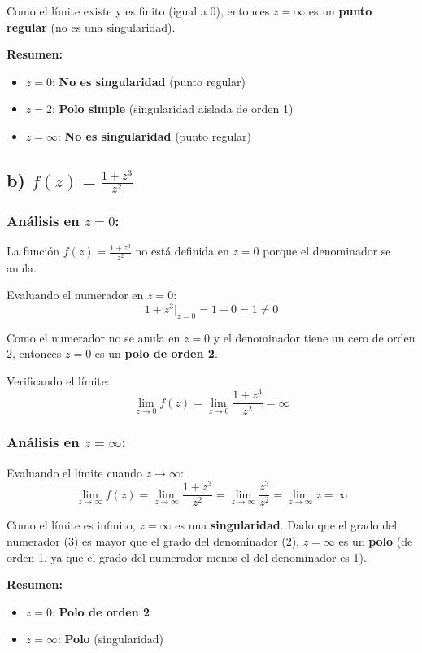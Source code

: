 \documentclass{article}
\begin{document}
Como el límite existe y es finito (igual a 0), entonces $z = \infty$ es un \textbf{punto regular} (no es una singularidad).

\textbf{Resumen:}
\begin{itemize}
\item $z = 0$: \textbf{No es singularidad} (punto regular)
\item $z = 2$: \textbf{Polo simple} (singularidad aislada de orden 1)
\item $z = \infty$: \textbf{No es singularidad} (punto regular)
\end{itemize}

\subsection*{b) $f(z) = \frac{1 + z^3}{z^2}$}

\subsubsection*{Análisis en $z = 0$:}

La función $f(z) = \frac{1 + z^3}{z^2}$ no está definida en $z = 0$ porque el denominador se anula.

Evaluando el numerador en $z = 0$:
$$1 + z^3\Big|_{z=0} = 1 + 0 = 1 \neq 0$$

Como el numerador no se anula en $z = 0$ y el denominador tiene un cero de orden 2, entonces $z = 0$ es un \textbf{polo de orden 2}.

Verificando el límite:
$$\lim_{z \to 0} f(z) = \lim_{z \to 0} \frac{1 + z^3}{z^2} = \infty$$

\subsubsection*{Análisis en $z = \infty$:}

Evaluando el límite cuando $z \to \infty$:
$$\lim_{z \to \infty} f(z) = \lim_{z \to \infty} \frac{1 + z^3}{z^2} = \lim_{z \to \infty} \frac{z^3}{z^2} = \lim_{z \to \infty} z = \infty$$

Como el límite es infinito, $z = \infty$ es una \textbf{singularidad}. Dado que el grado del numerador (3) es mayor que el grado del denominador (2), $z = \infty$ es un \textbf{polo} (de orden 1, ya que el grado del numerador menos el del denominador es 1).

\textbf{Resumen:}
\begin{itemize}
\item $z = 0$: \textbf{Polo de orden 2}
\item $z = \infty$: \textbf{Polo} (singularidad)
\end{itemize}
\end{document}
